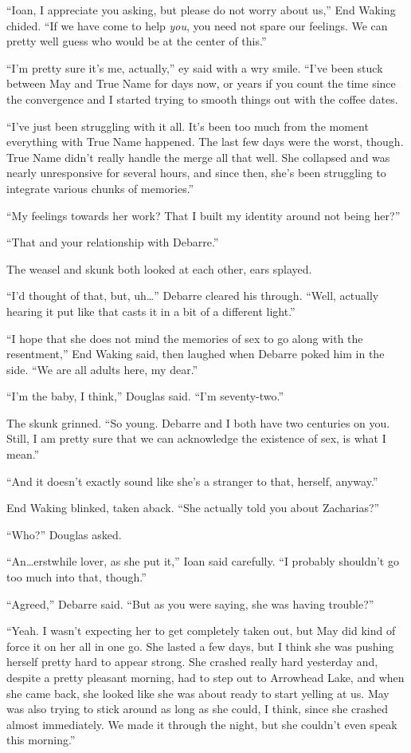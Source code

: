 ``Ioan, I appreciate you asking, but please do not worry about us,'' End Waking chided. ``If we have come to help \emph{you}, you need not spare our feelings. We can pretty well guess who would be at the center of this.''

``I'm pretty sure it's me, actually,'' ey said with a wry smile. ``I've been stuck between May and True Name for days now, or years if you count the time since the convergence and I started trying to smooth things out with the coffee dates.

``I've just been struggling with it all. It's been too much from the moment everything with True Name happened. The last few days were the worst, though. True Name didn't really handle the merge all that well. She collapsed and was nearly unresponsive for several hours, and since then, she's been struggling to integrate various chunks of memories.''

``My feelings towards her work? That I built my identity around not being her?''

``That and your relationship with Debarre.''

The weasel and skunk both looked at each other, ears splayed.

``I'd thought of that, but, uh\ldots{}'' Debarre cleared his through. ``Well, actually hearing it put like that casts it in a bit of a different light.''

``I hope that she does not mind the memories of sex to go along with the resentment,'' End Waking said, then laughed when Debarre poked him in the side. ``We are all adults here, my dear.''

``I'm the baby, I think,'' Douglas said. ``I'm seventy-two.''

The skunk grinned. ``So young. Debarre and I both have two centuries on you. Still, I am pretty sure that we can acknowledge the existence of sex, is what I mean.''

``And it doesn't exactly sound like she's a stranger to that, herself, anyway.''

End Waking blinked, taken aback. ``She actually told you about Zacharias?''

``Who?'' Douglas asked.

``An\ldots erstwhile lover, as she put it,'' Ioan said carefully. ``I probably shouldn't go too much into that, though.''

``Agreed,'' Debarre said. ``But as you were saying, she was having trouble?''

``Yeah. I wasn't expecting her to get completely taken out, but May did kind of force it on her all in one go. She lasted a few days, but I think she was pushing herself pretty hard to appear strong. She crashed really hard yesterday and, despite a pretty pleasant morning, had to step out to Arrowhead Lake, and when she came back, she looked like she was about ready to start yelling at us. May was also trying to stick around as long as she could, I think, since she crashed almost immediately. We made it through the night, but she couldn't even speak this morning.''

